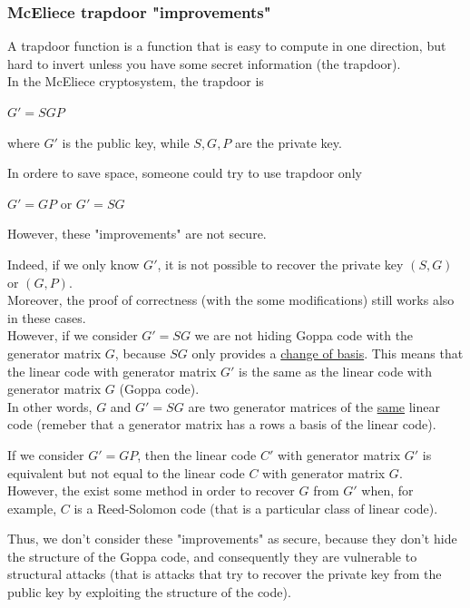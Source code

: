 \newpage
\subsubsection{McEliece trapdoor "improvements"}
A trapdoor function is a function that is easy to compute in one direction, but hard to invert unless you have some secret information (the trapdoor).\\
In the McEliece cryptosystem, the trapdoor is
\begin{center}
    $G' = SGP$
\end{center}
\noindent
where $G'$ is the public key, while $S, G, P$ are the private key.
\medskip

\noindent
In ordere to save space, someone could try to use trapdoor only
\begin{center}
    $G' = GP$ or $G' = SG$
\end{center}
\noindent
However, these "improvements" are not secure.
\medskip

\noindent
Indeed, if we only know $G'$, it is not possible to recover the private key $(S, G)$ or $(G, P)$.\\
Moreover, the proof of correctness (with the some modifications) still works also in these cases.\\
However, if we consider $G'=SG$ we are not hiding Goppa code with the generator matrix $G$, because $SG$ only provides a \underline{change of basis}. This means that the linear code with generator matrix $G'$ is the same as the linear code with generator matrix $G$ (Goppa code).\\
In other words, $G$ and $G'= SG$ are two generator matrices of the \underline{same} linear code (remeber that a generator matrix has a rows a basis of the linear code).\\
\medskip

\noindent
If we consider $G' = GP$, then the linear code $C'$ with generator matrix $G'$ is equivalent but not equal to the linear code $C$ with generator matrix $G$.\\
However, the exist some method in order to recover $G$ from $G'$ when, for example, $C$ is a Reed-Solomon code (that is a particular class of linear code).
\medskip

\noindent
Thus, we don't consider these "improvements" as secure, because they don't hide the structure of the Goppa code, and consequently they are vulnerable to structural attacks (that is attacks that try to recover the private key from the public key by exploiting the structure of the code).

